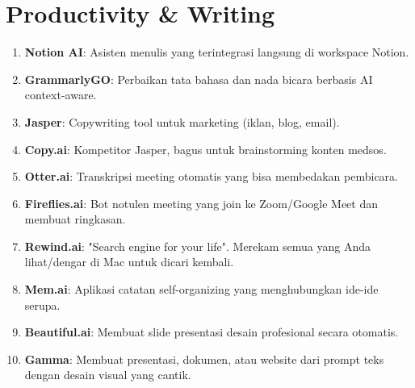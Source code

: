 \section{Productivity \& Writing}
\begin{enumerate}
    \item \textbf{Notion AI}: Asisten menulis yang terintegrasi langsung di workspace Notion.
    \item \textbf{GrammarlyGO}: Perbaikan tata bahasa dan nada bicara berbasis AI context-aware.
    \item \textbf{Jasper}: Copywriting tool untuk marketing (iklan, blog, email).
    \item \textbf{Copy.ai}: Kompetitor Jasper, bagus untuk brainstorming konten medsos.
    \item \textbf{Otter.ai}: Transkripsi meeting otomatis yang bisa membedakan pembicara.
    \item \textbf{Fireflies.ai}: Bot notulen meeting yang join ke Zoom/Google Meet dan membuat ringkasan.
    \item \textbf{Rewind.ai}: "Search engine for your life". Merekam semua yang Anda lihat/dengar di Mac untuk dicari kembali.
    \item \textbf{Mem.ai}: Aplikasi catatan self-organizing yang menghubungkan ide-ide serupa.
    \item \textbf{Beautiful.ai}: Membuat slide presentasi desain profesional secara otomatis.
    \item \textbf{Gamma}: Membuat presentasi, dokumen, atau website dari prompt teks dengan desain visual yang cantik.
\end{enumerate}

